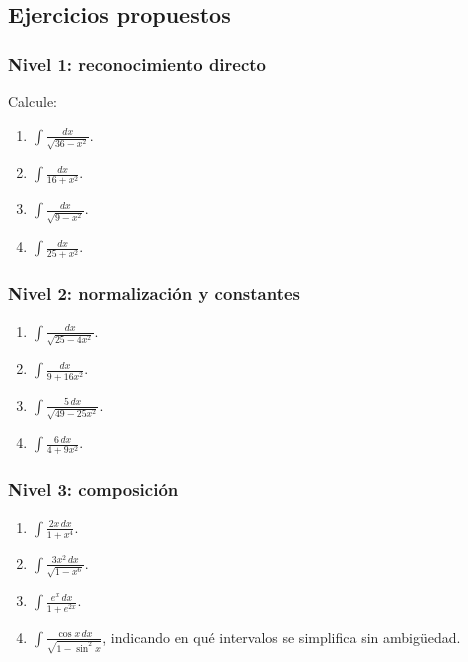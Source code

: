 \documentclass[12pt]{article}
\theoremstyle{definition}
\theoremstyle{remark}
\begin{document}
\subsection{Ejercicios propuestos}

\subsubsection*{Nivel 1: reconocimiento directo}
Calcule:
\begin{enumerate}[label=\arabic*.]
\item $\displaystyle \int\frac{dx}{\sqrt{36-x^2}}$.
\item $\displaystyle \int\frac{dx}{16+x^2}$.
\item $\displaystyle \int\frac{dx}{\sqrt{9-x^2}}$.
\item $\displaystyle \int\frac{dx}{25+x^2}$.
\end{enumerate}

\subsubsection*{Nivel 2: normalización y constantes}
\begin{enumerate}[label=\arabic*.,resume]
\item $\displaystyle \int\frac{dx}{\sqrt{25-4x^2}}$.
\item $\displaystyle \int\frac{dx}{9+16x^2}$.
\item $\displaystyle \int\frac{5\,dx}{\sqrt{49-25x^2}}$.
\item $\displaystyle \int\frac{6\,dx}{4+9x^2}$.
\end{enumerate}

\subsubsection*{Nivel 3: composición}
\begin{enumerate}[label=\arabic*.,resume]
\item $\displaystyle \int\frac{2x\,dx}{1+x^4}$.
\item $\displaystyle \int\frac{3x^2\,dx}{\sqrt{1-x^6}}$.
\item $\displaystyle \int\frac{e^x\,dx}{1+e^{2x}}$.
\item $\displaystyle \int\frac{\cos x\,dx}{\sqrt{1-\sin^2x}}$, indicando en qué intervalos se simplifica sin ambigüedad.
\end{enumerate}
\end{document}
